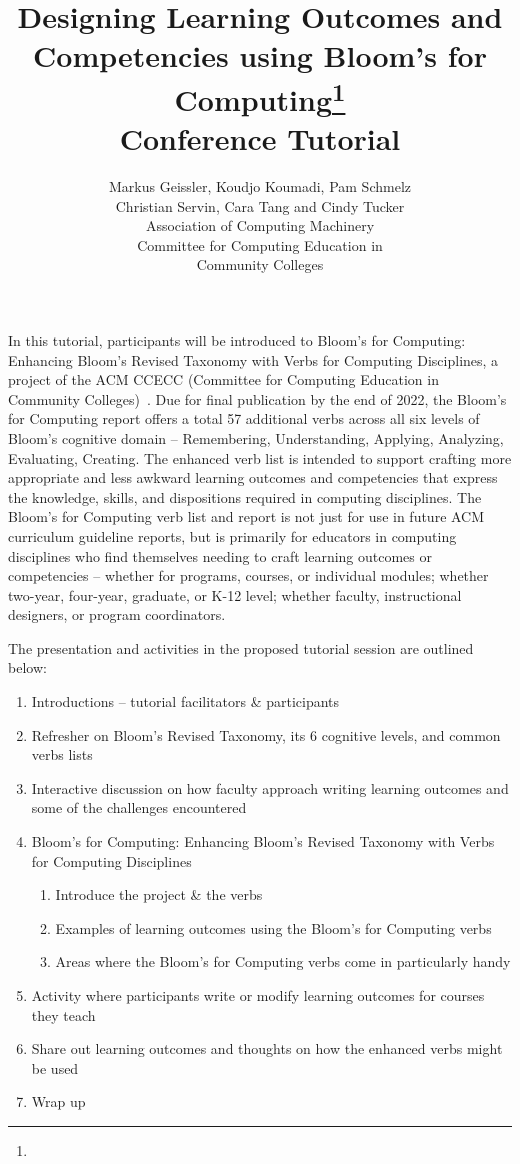 \documentclass{article}
\title{Designing Learning Outcomes and Competencies using Bloom's for Computing\footnote{\protect}
\\
\vspace{0.2in}
\large{
Conference Tutorial
}}
\author{
	Markus Geissler, Koudjo Koumadi, Pam Schmelz\\ Christian Servin, Cara Tang and Cindy Tucker \\
	Association of Computing Machinery\\
	Committee for Computing Education in\\ Community Colleges\\
%	
%	
%	
%	
%	
%	
%	
}
\begin{document}
	\maketitle
	
	In this tutorial, participants will be introduced to Bloom's for Computing: Enhancing Bloom's Revised Taxonomy with Verbs for Computing Disciplines, a project of the ACM CCECC (Committee for Computing Education in Community Colleges)~\cite{Geissler2022,Servin2021,Tang2022,Tang2022a}. Due for final publication by the end of 2022, the Bloom's for Computing report offers a total 57 additional verbs across all six levels of Bloom's cognitive domain – Remembering, Understanding, Applying, Analyzing, Evaluating, Creating. The enhanced verb list is intended to support crafting more appropriate and less awkward learning outcomes and competencies that express the knowledge, skills, and dispositions required in computing disciplines. The Bloom's for Computing verb list and report is not just for use in future ACM curriculum guideline reports, but is primarily for educators in computing disciplines who find themselves needing to craft learning outcomes or competencies – whether for programs, courses, or individual modules; whether two-year, four-year, graduate, or K-12 level; whether faculty, instructional designers, or program coordinators.
	

	The presentation and activities in the proposed tutorial session are outlined below:
	\begin{enumerate}
		\item Introductions – tutorial facilitators \& participants
		\item Refresher on Bloom's Revised Taxonomy, its 6 cognitive levels, and common verbs lists
		\item Interactive discussion on how faculty approach writing learning outcomes and some of the challenges encountered
		\item Bloom's for Computing: Enhancing Bloom's Revised Taxonomy with Verbs for Computing Disciplines
		\begin{enumerate}
			\item Introduce the project \& the verbs
			\item Examples of learning outcomes using the Bloom's for Computing verbs
			\item Areas where the Bloom's for Computing verbs come in particularly handy
		\end{enumerate}
		\item Activity where participants write or modify learning outcomes for courses they teach
		\item Share out learning outcomes and thoughts on how the enhanced verbs might be used
		\item Wrap up
		
	\end{enumerate}
	
\end{document}
